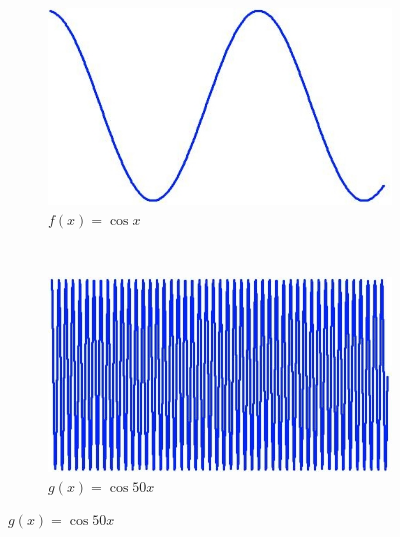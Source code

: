 \documentclass{report}
\begin{document}
\begin{figure}[h]
        \centering
        \begin{subfigure}[b]{0.2\textwidth}
                \includegraphics[width=\textwidth]{graphics/graph_fft_1.jpg}
                \caption{$f(x)=\cos{x}$}
                \label{fig:gull}
        \end{subfigure}%
        ~
        \begin{subfigure}[b]{0.2\textwidth}
                \includegraphics[width=\textwidth]{graphics/graph_fft_2.jpg}
                \caption{$g(x)=\cos{50x}$}
                \label{fig:tiger}
        \end{subfigure}
        

\end{figure}
\end{document}
